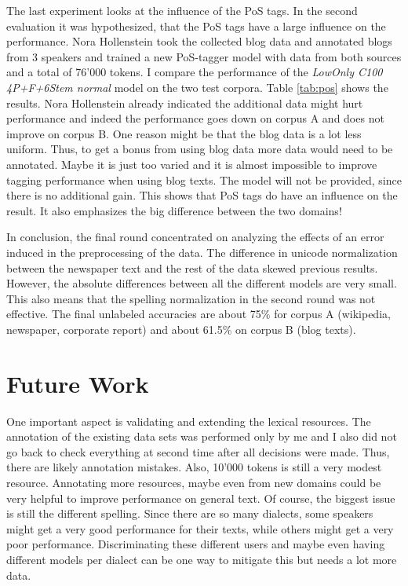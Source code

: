 \documentclass[11pt,letterpaper, covington]{article}
\begin{document}
The last experiment looks at the influence of the PoS tags. In the second evaluation it was hypothesized, that the PoS tags have a large influence on the performance. Nora Hollenstein took the collected blog data and annotated blogs from 3 speakers and trained a new PoS-tagger model with data from both sources and a total of 76'000 tokens.
I compare the performance of the \emph{LowOnly C100 4P+F+6Stem normal} model on the two test corpora. Table \ref{tab:pos} shows the results.  Nora Hollenstein already indicated the additional data might hurt performance and indeed the performance goes down on corpus A and does not improve on corpus B. One reason might be that the blog data is a lot less uniform. Thus, to get a bonus from using blog data more data would need to be annotated. Maybe it is just too varied and it is almost impossible to improve tagging performance when using blog texts. The model will not be provided, since there is no additional gain. This shows that PoS tags do have an influence on the result. It also emphasizes the big difference between the two domains!

In conclusion, the final round concentrated on analyzing the effects of an error induced in the preprocessing of the data. The difference in unicode normalization between the newspaper text and the rest of the data skewed previous results. However, the absolute differences between all the different models are very small. This also means that the spelling normalization in the second round was not effective. The final unlabeled accuracies are about 75\% for corpus A (wikipedia, newspaper, corporate report) and about 61.5\% on corpus B (blog texts).

\section{Future Work}

One important aspect is validating and extending the lexical resources. The annotation of the existing data sets was performed only by me and I also did not go back to check everything at second time after all decisions were made. Thus, there are likely annotation mistakes. Also, 10'000 tokens is still a very modest resource. Annotating more resources, maybe even from new domains could be very helpful to improve performance on general text. Of course, the biggest issue is still the different spelling. Since there are so many dialects, some speakers might get a very good performance for their texts, while others might get a very poor performance. Discriminating these different users and maybe even having different models per dialect can be one way to mitigate this but needs a lot more data.
\end{document}

